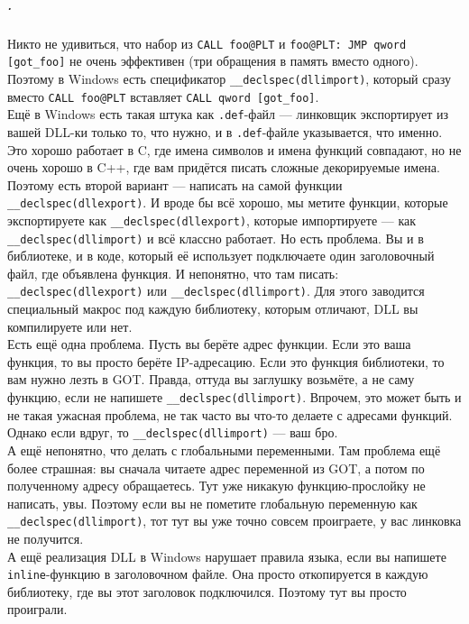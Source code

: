 \documentclass{article}
\newcommand{\asm}[1]{\texttt{#1}}
\begin{document}
    \subparagraph{.}
    Никто не удивиться, что набор из \asm{CALL foo@PLT} и \asm{foo@PLT: JMP qword [got_foo]} не очень эффективен (три обращения в память вместо одного). Поэтому в Windows есть спецификатор \texttt{__declspec(dllimport)}, который сразу вместо \asm{CALL foo@PLT} вставляет \asm{CALL qword [got_foo]}.\\
    Ещё в Windows есть такая штука как \texttt{.def}-файл --- линковщик экспортирует из вашей DLL-ки только то, что нужно, и в \texttt{.def}-файле указывается, что именно. Это хорошо работает в C, где имена символов и имена функций совпадают, но не очень хорошо в C++, где вам придётся писать сложные декорируемые имена. Поэтому есть второй вариант --- написать на самой функции \texttt{__declspec(dllexport)}. И вроде бы всё хорошо, мы метите функции, которые экспортируете как \texttt{__declspec(dllexport)}, которые импортируете --- как \texttt{__declspec(dllimport)} и всё классно работает. Но есть проблема. Вы и в библиотеке, и в коде, который её использует подключаете один заголовочный файл, где объявлена функция. И непонятно, что там писать: \texttt{__declspec(dllexport)} или \texttt{__declspec(dllimport)}. Для этого заводится специальный макрос под каждую библиотеку, которым отличают, DLL вы компилируете или нет.\\
    Есть ещё одна проблема. Пусть вы берёте адрес функции. Если это ваша функция, то вы просто берёте IP-адресацию. Если это функция библиотеки, то вам нужно лезть в GOT. Правда, оттуда вы заглушку возьмёте, а не саму функцию, если не напишете \texttt{__declspec(dllimport)}. Впрочем, это может быть и не такая ужасная проблема, не так часто вы что-то делаете с адресами функций. Однако если вдруг, то \texttt{__declspec(dllimport)} --- ваш бро.\\
    А ещё непонятно, что делать с глобальными переменными. Там проблема ещё более страшная: вы сначала читаете адрес переменной из GOT, а потом по полученному адресу обращаетесь. Тут уже никакую функцию-прослойку не написать, увы. Поэтому если вы не пометите глобальную переменную как \texttt{__declspec(dllimport)}, тот тут вы уже точно совсем проиграете, у вас линковка не получится.\\
    А ещё реализация DLL в Windows нарушает правила языка, если вы напишете \texttt{inline}-функцию в заголовочном файле. Она просто откопируется в каждую библиотеку, где вы этот заголовок подключился. Поэтому тут вы просто проиграли.\\
\end{document}
